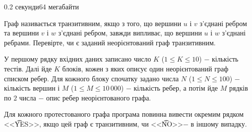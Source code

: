 \begin{problem}{}{}{}{0.2 секунди}{64 мегабайти}

Граф називається транзитивним, якщо з того, що вершини $u$ і $v$ з'єднані ребром та вершини $v$ і $w$ з'єднані ребром, 
завжди випливає, що вершини $u$ і $w$ з'єднані ребрами.
Перевірте, чи є заданий неорієнтований граф транзитивним.

\InputFile
У першому рядку вхідних даних записано число $K$ ($1 \le K \le 10$) $-$ кількість тестів. 
Далі йде $K$ блоків, кожен з яких описує один неорієнтований граф списком ребер. 
Для кожного блоку спочатку задано числа $N$ ($1 \le N \le 100$) $-$ кількість вершин і $M$ ($1 \le M \le 10\,000$) $-$ кількість ребер,
а потім йде $M$ рядків по $2$ числа $-$ опис ребер неорієнтованого графа.

\OutputFile
Для кожного протестованого графа програма повинна вивести окремим рядком <<{\t{YES}}>>, якщо цей граф є транзитивним, чи <<{\t{NO}}>>$-$ в іншому випадку.

\Example

\begin{example}
%
\end{example}

\end{problem}
